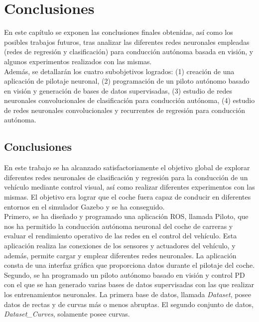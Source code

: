 \chapter{Conclusiones}\label{cap.conclusiones}

En este capítulo se exponen las conclusiones finales obtenidas, así como los posibles trabajos futuros, tras analizar las diferentes redes neuronales empleadas (redes de regresión y clasificación) para conducción autónoma basada en visión, y algunos experimentos realizados con las mismas.\\

Además, se detallarán los cuatro subobjetivos logrados: (1) creación de una aplicación de pilotaje neuronal, (2) programación de un piloto autónomo basado en visión y generación de bases de datos supervisadas, (3) estudio de redes neuronales convolucionales de clasificación para conducción autónoma, (4) estudio de redes neuronales convolucionales y recurrentes de regresión para conducción autónoma.\\

\section{Conclusiones}

En este trabajo se ha alcanzado satisfactoriamente el objetivo global de explorar diferentes redes neuronales de clasificación y regresión para la conducción de un vehículo mediante control visual, así como realizar diferentes experimentos con las mismas. El objetivo era lograr que el coche fuera capaz de conducir en diferentes entornos en el simulador Gazebo y se ha conseguido. \\

Primero, se ha diseñado y programado una aplicación ROS, llamada Piloto, que nos ha permitido la conducción autónoma neuronal del coche de carreras y evaluar el rendimiento operativo de las redes en el control del vehículo. Esta aplicación realiza las conexiones de los sensores y actuadores del vehículo, y además, permite cargar  y emplear diferentes redes neuronales. La aplicación consta de una interfaz gráfica que proporciona datos durante el pilotaje del coche. \\

Segundo, se ha programado un piloto autónomo basado en visión y control PD con el que se han generado varias bases de datos supervisadas con las que realizar los entrenamientos neuronales. La primera base de datos, llamada \textit{Dataset}, posee datos de rectas y de curvas más o menos abruptas. El segundo conjunto de datos, \textit{Dataset\_Curves}, solamente posee curvas.\\



